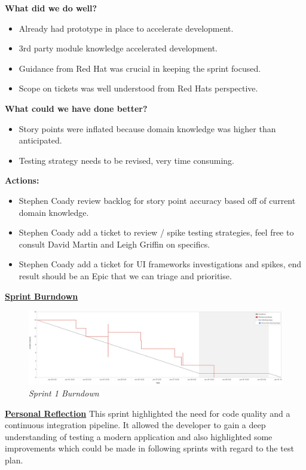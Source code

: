 \textbf{What did we do well?}
\begin{itemize}
	\item Already had prototype in place to accelerate development.
	\item 3rd party module knowledge accelerated development.
	\item Guidance from Red Hat was crucial in keeping the sprint focused.
	\item Scope on tickets was well understood from Red Hats perspective.
\end{itemize}

\textbf{What could we have done better?}
\begin{itemize}
	\item Story points were inflated because domain knowledge was higher than anticipated.
	\item Testing strategy needs to be revised, very time consuming.
\end{itemize}

\textbf{Actions:}
\begin{itemize}
	\item Stephen Coady review backlog for story point accuracy based off of current domain knowledge.
	\item Stephen Coady add a ticket to review / spike testing strategies, feel free to consult David Martin and Leigh Griffin on specifics.
	\item Stephen Coady add a ticket for UI frameworks investigations and spikes, end result should be an Epic that we can triage and prioritise.
\end{itemize}

\underline{\textbf{Sprint Burndown}}\newline
\begin{figure}[!ht]
\centering
\includegraphics*[width=\textwidth]{images/sprint1}
\caption{\em Sprint 1 Burndown}
\label{fig:sprint1}
\end{figure}

\underline{\textbf{Personal Reflection}}\newline
This sprint highlighted the need for code quality and a continuous integration pipeline. It allowed the developer to gain a deep understanding of testing a modern application and also highlighted some improvements which could be made in following sprints with regard to the test plan.


